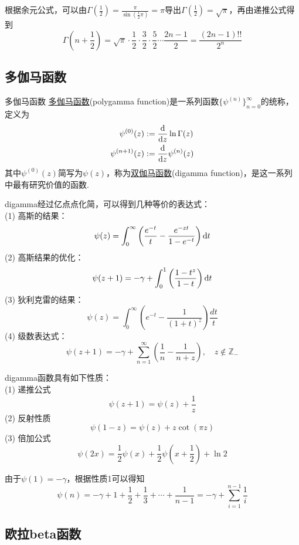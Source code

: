 \documentclass[main.tex]{subfiles}
\begin{document}
根据余元公式，可以由\(\displaystyle{\Gamma\left(\frac{1}{2}\right) = \frac{\pi}{\sin(\frac{1}{2}\pi)} = \pi}\)导出\(\displaystyle{\Gamma(\frac{1}{2}) = \sqrt{\pi}}\)，再由递推公式得到
\[ \Gamma\left(n+\frac{1}{2}\right) = \sqrt{\pi}\cdot\frac{1}{2}\cdot\frac{3}{2}\cdot\frac{5}{2}\cdots\frac{2n-1}{2} = \frac{(2n-1)!!}{2^n} \]

\subsection{多伽马函数}

\begin{definition}{多伽马函数}
    \uline{多伽马函数}(polygamma function)是一系列函数\(\{\psi^{(n)}\}_{n=0}^{\infty}\)的统称，定义为
    \begin{align*}
        \psi^{(0)}(z) &:= \frac{{\rm d}}{{\rm d}z} \ln \Gamma(z) \\
        \psi^{(n+1)}(z) &:= \frac{{\rm d}}{{\rm d}z} \psi^{(n)}(z)\\
    \end{align*}
    其中\(\psi^{(0)}(z)\)简写为\(\psi(z)\)，称为\uline{双伽马函数}(digamma function)，是这一系列中最有研究价值的函数.
\end{definition}

digamma经过亿点点化简，可以得到几种等价的表达式：\\
(1) 高斯的结果：
\[ \psi(z) = \int_{0}^{\infty} \left( \frac{e^{-t}}{t} - \frac{e^{-zt}}{1-e^{-t}} \right) {\rm d}t \]
(2) 高斯结果的优化：
\[ \psi(z+1) = -\gamma+\int_0^1 \left(\frac{1-t^z}{1-t}\right) {\rm d} t \]
(3) 狄利克雷的结果：
\[ \psi(z)=\int _{0}^{\infty }\left(e^{-t}-{\frac {1}{(1+t)^{z}}}\right) {\frac {dt}{t}} \]
(4) 级数表达式：
\[ \psi (z+1) =-\gamma +\sum _{n=1}^{\infty }\left({\frac {1}{n}}-{\frac {1}{n+z}}\right), \quad z \not \in \mathbb{Z}_-\]

digamma函数具有如下性质：\\
(1) 递推公式
\[ \psi(z+1) = \psi(z)+\frac{1}{z} \]
(2) 反射性质
\[ \psi(1-z) = \psi(z)+z\cot(\pi z) \]
(3) 倍加公式
\[ \psi(2x) = \frac{1}{2}\psi(x) +\frac{1}{2}\psi\left( x+\frac{1}{2} \right) +\ln 2 \]

由于\(\psi(1) = -\gamma\)，根据性质1可以得知
\[\psi(n) = -\gamma + 1 + \frac{1}{2} + \frac{1}{3} + \cdots + \frac{1}{n-1} = -\gamma+\sum_{i=1}^{n-1} \frac{1}{i} \]

\subsection{欧拉beta函数}
\end{document}
